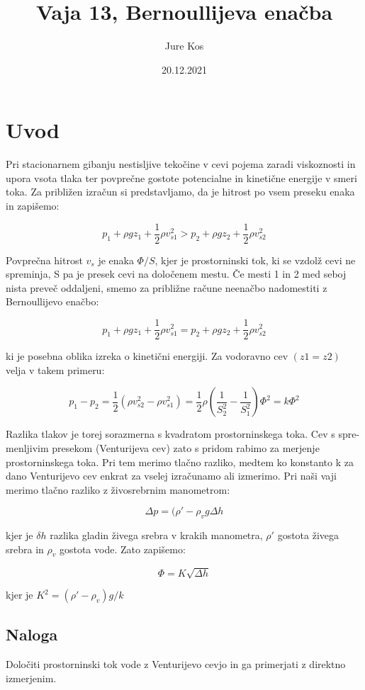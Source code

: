 \documentclass[a4paper]{report}
\author{Jure Kos}
\title{Vaja 13, Bernoullijeva enačba}
\date{20.12.2021}
\begin{document}
\maketitle

\chapter*{Uvod}
Pri stacionarnem gibanju nestisljive tekočine v cevi pojema zaradi viskoznosti in upora vsota tlaka ter povprečne gostote potencialne in kinetične energije v smeri toka. Za približen izračun si predstavljamo, da je hitrost po vsem preseku enaka in zapišemo:

\[p_1+\rho gz_1+\frac{1}{2}\rho v_{s1}^2 > p_2+\rho gz_2+\frac{1}{2}\rho v_{s2}^2\]

Povprečna hitrost $v_s$ je enaka $\Phi/S$, kjer je prostorninski tok, ki se vzdolž cevi ne spreminja, S pa je presek cevi na določenem mestu. Če mesti 1 in 2 med seboj nista preveč oddaljeni, smemo za približne račune neenačbo nadomestiti z Bernoullijevo enačbo:

\[p_1+\rho gz_1+\frac{1}{2}\rho v_{s1}^2 = p_2+\rho gz_2+\frac{1}{2}\rho v_{s2}^2\]

ki je posebna oblika izreka o kinetični energiji. Za vodoravno cev $(z1 = z2)$ velja v takem primeru:

\[p_1-p_2=\frac{1}{2}(\rho v_{s2}^2-\rho v_{s1}^2)=\frac{1}{2}\rho\left(\frac{1}{S_2^2}-\frac{1}{S_1^2}\right)\Phi^2=k\Phi^2\]

Razlika tlakov je torej sorazmerna s kvadratom prostorninskega toka. Cev s spre-
menljivim presekom (Venturijeva cev) zato s pridom rabimo za merjenje prostorninskega toka. Pri tem merimo tlačno razliko, medtem ko konstanto k za dano Venturijevo cev enkrat za vselej izračunamo ali izmerimo. Pri naši vaji merimo tlačno razliko z živosrebrnim manometrom: 

\[\Delta p=(\rho'-\rho_v g \Delta h\]

kjer je $\delta h$ razlika gladin živega srebra v krakih manometra, $\rho'$ gostota živega srebra in $\rho_v$ gostota vode. Zato zapišemo:

\[\Phi=K\sqrt{\Delta h}\]

kjer je $K^2=(\rho'-\rho_v)g/k$


\section{Naloga}
Določiti prostorninski tok vode z Venturijevo cevjo in ga primerjati z direktno izmerjenim.
\end{document}
